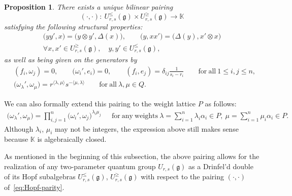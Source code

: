\documentclass[pdftex]{sigma}
\numberwithin{equation}{section}
\newtheorem{Proposition}[Theorem]{Proposition}
 { \theoremstyle{definition}
\newtheorem{Definition}[Theorem]{Definition}
\newtheorem{Note}[Theorem]{Note}
\newtheorem{Example}[Theorem]{Example}
\newtheorem{Remark}[Theorem]{Remark} }
\newcommand{\fg}{\mathfrak{g}}
\begin{document}
\begin{Proposition}\label{prop:pairing_2param}
There exists a unique bilinear pairing
\begin{equation}\label{eq:Hopf-parity}
 (\cdot,\cdot)\colon\ U_{r,s}^{\le}(\fg) \times U_{r,s}^{\ge}(\fg) \to \mathbb{K}
\end{equation}
satisfying the following structural properties:
{\samepage\begin{gather}
 \bigl(yy',x\bigr) = \bigl(y \otimes y',\Delta(x)\bigr), \qquad \bigl(y, xx'\bigr) = \bigl(\Delta(y),x' \otimes x\bigr)\nonumber\\
 \forall x,x' \in U_{r,s}^{\ge}(\fg),\quad y,y' \in U_{r,s}^{\le}(\fg),\label{eq:Hopf-properties}
\end{gather}
as well as being given on the generators by}
\begin{align}
 & (f_{i},\omega_{j}) = 0, \qquad \bigl(\omega_{i}', e_{i}\bigr) = 0, \qquad
 (f_{i},e_{j}) = \delta_{ij}\frac{1}{s_{i} - r_{i}} \qquad \mathrm{for\ all} \ 1\leq i,j\leq n , \nonumber\\
 & \bigl(\omega_{\lambda}',\omega_{\mu}\bigr) = r^{\langle \lambda,\mu\rangle}s^{-\langle \mu,\lambda \rangle}
 \qquad \mathrm{for\ all} \ \lambda,\mu\in Q.\label{eq:generators-parity}
\end{align}
\end{Proposition}

We can also formally extend this pairing to the weight lattice $P$ as follows:
\begin{gather}
 \bigl(\omega_{\lambda}',\omega_{\mu}\bigr) = \prod_{i,j = 1}^{n}\bigl(\omega_{i}',\omega_{j}\bigr)^{\lambda_{i}\mu_{j}} \quad \ \
\mathrm{for\ any\ weights} \
 \lambda = \sum_{i = 1}^{n} \lambda_{i}\alpha_{i}\in P,\ \mu = \sum_{i = 1}^{n} \mu_{i}\alpha_{i} \in P.\label{eq:weight-pairing}
\end{gather}
Although $\lambda_{i}$, $\mu_{i}$ may not be integers, the expression above still makes sense because $\mathbb{K}$ is algebraically closed.

\begin{Remark}
As mentioned in the beginning of this subsection, the above pairing allows for the realization of any two-parameter quantum group $U_{r,s}(\fg)$ as a Drinfel’d double of its Hopf subalgebras $U^{\leq}_{r,s}(\fg)$, $U^{\geq}_{r,s}(\fg)$ with respect to the pairing $(\cdot,\cdot)$ of~\eqref{eq:Hopf-parity}.
\end{Remark}
\end{document}
